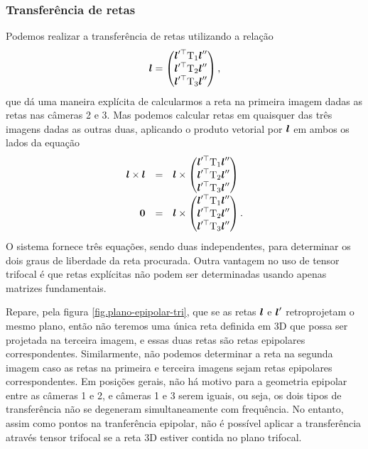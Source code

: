 \subsubsection{Transferência de retas}
Podemos realizar a transferência de retas utilizando a relação
\begin{equation*}
\boldsymbol{l}=
\begin{pmatrix}
\boldsymbol{l}'^\top \mbox{T}_1\boldsymbol{l}''\\
\boldsymbol{l}'^\top \mbox{T}_2\boldsymbol{l}''\\
\boldsymbol{l}'^\top \mbox{T}_3\boldsymbol{l}''
\end{pmatrix},
\end{equation*}
que dá uma maneira explícita de calcularmos a reta na primeira imagem dadas as retas nas câmeras 2 e 3. Mas podemos calcular retas em quaisquer das três imagens dadas as outras duas, aplicando o produto vetorial por $\boldsymbol{l}$ em ambos os lados da equação
\begin{equation*}
\begin{array}{rcl}
\boldsymbol{l}\times\boldsymbol{l}&=&\boldsymbol{l}\times
\begin{pmatrix}
\boldsymbol{l}'^\top \mbox{T}_1\boldsymbol{l}''\\
\boldsymbol{l}'^\top \mbox{T}_2\boldsymbol{l}''\\
\boldsymbol{l}'^\top \mbox{T}_3\boldsymbol{l}''
\end{pmatrix}\\
{\bf 0}&=&\boldsymbol{l}\times
\begin{pmatrix}
\boldsymbol{l}'^\top \mbox{T}_1\boldsymbol{l}''\\
\boldsymbol{l}'^\top \mbox{T}_2\boldsymbol{l}''\\
\boldsymbol{l}'^\top \mbox{T}_3\boldsymbol{l}''
\end{pmatrix}.\\
\end{array}
\end{equation*}
O sistema fornece três equações, sendo duas independentes, para determinar os dois graus de liberdade da reta procurada. Outra vantagem no uso de tensor trifocal é que retas explícitas não podem ser determinadas usando apenas matrizes fundamentais.

Repare, pela figura \ref{fig.plano-epipolar-tri}, que se as retas $\boldsymbol{l}$ e $\boldsymbol{l}'$ retroprojetam o mesmo plano, então não teremos uma única reta definida em 3D que possa ser projetada na terceira imagem, e essas duas retas são retas epipolares correspondentes. Similarmente, não podemos determinar a reta na segunda imagem caso as retas na primeira e terceira imagens sejam retas epipolares correspondentes. Em posições gerais, não há motivo para a geometria epipolar entre as câmeras 1 e 2, e câmeras 1 e 3 serem iguais, ou seja, os dois tipos de transferência não se degeneram simultaneamente com frequência. No entanto, assim como pontos na tranferência epipolar, não é possível aplicar a transferência através tensor trifocal se a reta 3D estiver contida no plano trifocal. 

